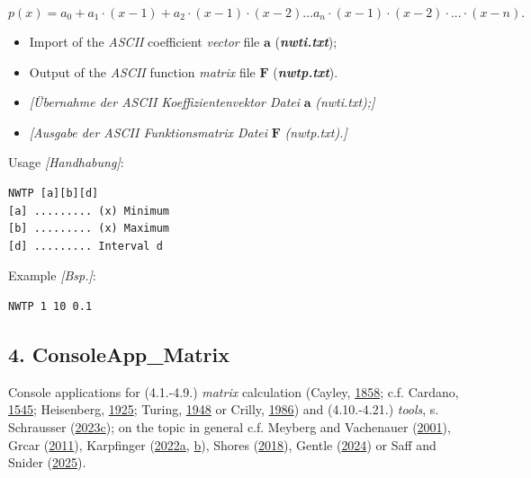 \documentclass[
]{article}
\begin{document}
\[p(x) = a_{0} + a_{1} \cdot (x - 1) + a_{2} \cdot (x - 1) \cdot (x - 2)...a_{n} \cdot (x - 1) \cdot (x - 2) \cdot ... \cdot (x - n).\]

\begin{itemize}
\item
  Import of the \emph{ASCII} coefficient \emph{vector} file
  \(\mathbf{a}\) (\textbf{\emph{nwti.txt}});
\item
  Output of the \emph{ASCII} function \emph{matrix} file \(\mathbf{F}\)
  (\textbf{\emph{nwtp.txt}}).
\item
  \emph{{[}Übernahme der ASCII Koeffizientenvektor Datei} \(\mathbf{a}\)
  \emph{(nwti.txt);{]}}
\item
  \emph{{[}Ausgabe der ASCII Funktionsmatrix Datei} \(\mathbf{F}\)
  \emph{(nwtp.txt).{]}}
\end{itemize}

Usage \emph{{[}Handhabung{]}}:

\begin{verbatim}
NWTP [a][b][d]
[a] ......... (x) Minimum
[b] ......... (x) Maximum
[d] ......... Interval d
\end{verbatim}

Example \emph{{[}Bsp.{]}}:

\begin{verbatim}
NWTP 1 10 0.1
\end{verbatim}

\hypertarget{consoleapp_matrix}{%
\subsection{4. ConsoleApp\_Matrix}\label{consoleapp_matrix}}

Console applications for (4.1.-4.9.) \emph{matrix} calculation (Cayley,
\href{http://www.jstor.org/stable/108649}{1858}; c.f. Cardano,
\href{https://web.archive.org/web/20220201093634/http:/www.filosofia.unimi.it/cardano/testi/operaomnia/vol_4_s_4.pdf}{1545};
Heisenberg, \href{https://doi.org/10.1007/BF01328377}{1925}; Turing,
\href{https://turing.academicwebsite.com/publications/20-rounding-off-errors-in-matrix-processes}{1948}
or Crilly, \href{https://doi.org/10.1016/0315-0860(86)90091-1}{1986})
and (4.10.-4.21.) \emph{tools}, s. Schrausser
(\href{https://doi.org/10.5281/zenodo.7655046}{2023c}); on the topic in
general c.f. Meyberg and Vachenauer
(\href{https://doi.org/10.1007/978-3-642-56654-7}{2001}), Grcar
(\href{https://doi.org/10.1016/j.hm.2010.06.003}{2011}), Karpfinger
(\href{https://doi.org/10.1007/978-3-662-65458-3_10}{2022a},
\href{https://doi.org/10.1007/978-3-662-63305-2_11}{b}), Shores
(\href{https://doi.org/10.1007/978-3-319-74748-4_2}{2018}), Gentle
(\href{https://doi.org/10.1007/978-3-031-42144-0}{2024}) or Saff and
Snider (\href{https://doi.org/10.1007/978-3-031-97222-5}{2025}).
\end{document}
